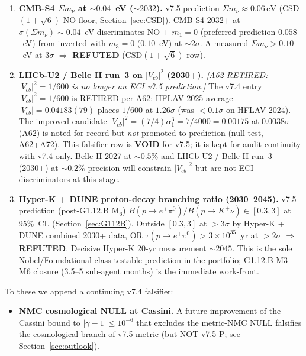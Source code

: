 \documentclass[a4paper,11pt]{article}
\theoremstyle{definition}
\theoremstyle{remark}
\begin{document}
\begin{enumerate}
    $>3\sigma$ relative to $n=3$, $\Rightarrow$ \textbf{REFUTED}.
  \item \textbf{CMB-S4 $\Sigma m_\nu$ at $\sim 0.04$~eV ($\sim
    2032$).}  v7.5 prediction
    $\Sigma m_\nu\approx 0.06\,\mathrm{eV}$ (CSD$(1+\sqrt 6)$
    NO floor, Section~\ref{sec:CSD}).  CMB-S4
    \cite{CMBS4} 2032+ at $\sigma(\Sigma m_\nu)\sim 0.04$~eV
    discriminates NO + $m_1=0$ (preferred prediction $0.058$~eV)
    from inverted with $m_3=0$ ($0.10$~eV) at $\sim 2\sigma$.
    A measured $\Sigma m_\nu>0.10$~eV at $3\sigma$
    $\Rightarrow$ \textbf{REFUTED} (CSD$(1+\sqrt 6)$ row).
  \item \textbf{LHCb-U2 / Belle II run~3 on $|V_{cb}|^{2}$
    (2030+).}
    \emph{[A62 RETIRED: $|V_{cb}|^2=1/600$ is no longer an
    ECI v7.5 prediction.]}
    The v7.4 entry $|V_{cb}|^{2}=1/600$ is RETIRED per A62:
    HFLAV-2025 average $|V_{cb}|=0.04183(79)$ places $1/600$ at
    $1.26\sigma$ (was $<0.1\sigma$ on HFLAV-2024).  The improved
    candidate $|V_{cb}|^2=(7/4)\alpha_1^3=7/4000=0.00175$ at
    $0.0038\sigma$ (A62) is noted for record but \emph{not}
    promoted to prediction (null test, A62+A72).
    This falsifier row is \textbf{VOID} for v7.5; it is kept
    for audit continuity with v7.4 only.
    Belle II 2027 at $\sim 0.5\%$ and LHCb-U2 / Belle II run~3
    (2030+) at $\sim 0.2\%$ precision will constrain $|V_{cb}|^2$
    but are not ECI discriminators at this stage.
  \item \textbf{Hyper-K + DUNE proton-decay branching ratio
    (2030--2045).}  v7.5 prediction (post-G1.12.B M$_6$)
    $B(p\to e^+\pi^0)/B(p\to K^+\bar\nu)\in[0.3,3]$ at 95\%~CL
    (Section~\ref{sec:G112B}).  Outside $[0.3,3]$ at $>3\sigma$
    by Hyper-K + DUNE combined 2030+ data, OR
    $\tau(p\to e^+\pi^0)>3\times 10^{35}$~yr at $>2\sigma$
    $\Rightarrow$ \textbf{REFUTED}.  Decisive Hyper-K 20-yr
    measurement $\sim 2045$.  This is the sole
    Nobel/Foundational-class testable prediction in the
    portfolio; G1.12.B M3--M6 closure (3.5--5 sub-agent months)
    is the immediate work-front.
\end{enumerate}

To these we append a continuing v7.4 falsifier:

\begin{itemize}
  \item[\textbf{(8)}] \textbf{NMC cosmological NULL at Cassini.}
    A future improvement of the Cassini bound to
    $|\gamma-1|\le 10^{-6}$ that excludes the metric-NMC NULL
    falsifies the cosmological branch of v7.5-metric (but NOT
    v7.5-P; see Section~\ref{sec:outlook}).
\end{itemize}
\end{document}
